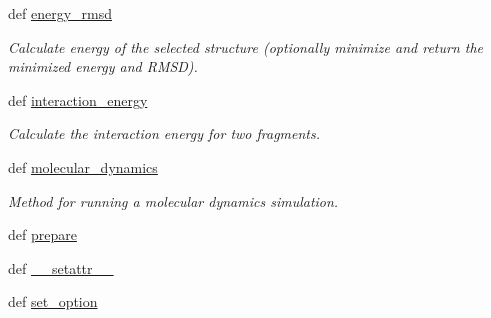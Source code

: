 \begin{DoxyCompactItemize}
def \hyperlink{classforcebalance_1_1tinkerio_1_1TINKER_a4c3ad9caa51f1c79e3cdf319b7be7162}{energy\-\_\-rmsd}
\begin{DoxyCompactList}\small\item\em Calculate energy of the selected structure (optionally minimize and return the minimized energy and R\-M\-S\-D). \end{DoxyCompactList}\item 
def \hyperlink{classforcebalance_1_1tinkerio_1_1TINKER_ae1e2192c6626b66dbc32e0e836e161b5}{interaction\-\_\-energy}
\begin{DoxyCompactList}\small\item\em Calculate the interaction energy for two fragments. \end{DoxyCompactList}\item 
def \hyperlink{classforcebalance_1_1tinkerio_1_1TINKER_a6c31a390a4df2ab9f7d4c4e72432274f}{molecular\-\_\-dynamics}
\begin{DoxyCompactList}\small\item\em Method for running a molecular dynamics simulation. \end{DoxyCompactList}\item 
def \hyperlink{classforcebalance_1_1engine_1_1Engine_a2eab57877002b41dc3742f0c67f2f24e}{prepare}
\item 
def \hyperlink{classforcebalance_1_1BaseClass_a0c851d413c3b2f30561b72a46771bcff}{\-\_\-\-\_\-setattr\-\_\-\-\_\-}
\item 
def \hyperlink{classforcebalance_1_1BaseClass_a73e9a37a7632e79eb99f49bd15aced45}{set\-\_\-option}
\end{DoxyCompactItemize}

